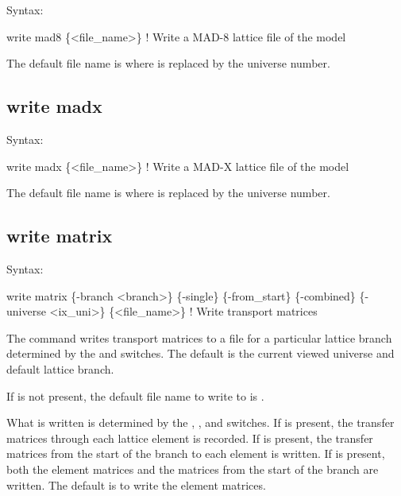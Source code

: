 {{{{{{{{{{{Syntax:
\begin{example}
    write mad8 \{<file_name>\}  ! Write a MAD-8 lattice file of the model
\end{example}

The default file name is  where \vn{\#} is replaced by the universe number. 


\subsection{write madx}
\label{s:write.madx}

Syntax:
\begin{example}
    write madx \{<file_name>\}  ! Write a MAD-X lattice file of the model
\end{example}

The default file name is  where \vn{\#} is replaced by the universe number. 


\subsection{write matrix}
\label{s:write.mat}

Syntax:
\begin{example}
    write matrix \{-branch <branch>\} \{-single\} \{-from_start\} \{-combined\}
               \{-universe <ix_uni>\} \{<file_name>\}  ! Write transport matrices
\end{example}

The  command writes transport matrices to a file for a particular lattice branch
determined by the  and  switches. The default is the current viewed
universe and default lattice branch.

If  is not present, the default file name to write to is .

What is written is determined by the , , and 
switches. If  is present, the transfer matrices through each lattice element is recorded.
If  is present, the transfer matrices from the start of the branch to each element
is written. If  is present, both the element matrices and the matrices from the start
of the branch are written. The default is to write the element matrices.

}}}}}}}}}}}

